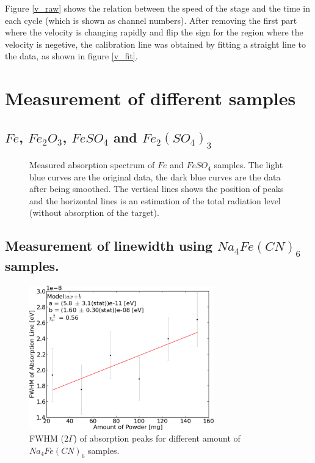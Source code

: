\documentclass[aps,twocolumn,secnumarabic,balancelastpage,amsmath,amssymb,nofootinbib]{revtex4}
\begin{document}
Figure \ref{v_raw} shows the relation between the speed of the stage and the time in each cycle (which is shown as channel numbers). After removing the first part where the velocity is changing rapidly and flip the sign for the region where the velocity is negetive, the calibration line was obtained by fitting a straight line to the data, as shown in figure \ref{v_fit}.

\section{Measurement of different samples}
\subsection{$Fe$, $Fe_2O_3$, $FeSO_4$ and $Fe_2(SO_4)_3$}
\begin{figure}
  \caption{Measured absorption spectrum of  $Fe$ and  $FeSO_4$ samples. The light blue curves are the original data, the dark blue curves are the data after being smoothed. The vertical lines shows the position of peaks and the horizontal lines is an estimation of the total radiation level (without absorption of the target).}
  \label{samples_raw}
\end{figure}

\subsection{Measurement of linewidth using $Na_4Fe(CN)_6$ samples.}
\begin{figure}
  \includegraphics[width=8cm]{../share/line_width.png}
  \caption{FWHM ($2\Gamma$) of absorption peaks for different amount of $Na_4Fe(CN)_6$ samples.}
  \label{line_width}
\end{figure}
\end{document}
